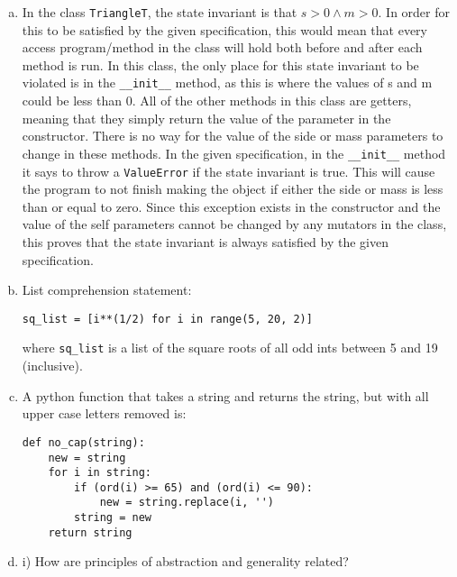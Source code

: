 \documentclass[12pt]{article}
\begin{document}
\begin{enumerate}[a)]
\item In the class \verb|TriangleT|, the state invariant is that $s > 0 \land m > 0$. In order 
for this to be satisfied by the given specification, this would mean that every access 
program/method in the class will hold both before and after each method is run. In this class, 
the only place for this state invariant to be violated is in the \verb|__init__| method, as this
is where the values of s and m could be less than 0. All of the other methods in this class are 
getters, meaning that they simply return the value of the parameter in the constructor. There is 
no way for the value of the side or mass parameters to change in these methods. In the given 
specification, in the \verb|__init__| method it says to throw a \verb|ValueError| if the state 
invariant is true. This will cause the program to not finish making the object if either the side 
or mass is less than or equal to zero. Since this exception exists in the constructor and the 
value of the self parameters cannot be changed by any mutators in the class, this proves that the 
state invariant is always satisfied by the given specification. 

\item List comprehension statement:

\begin{verbatim}
sq_list = [i**(1/2) for i in range(5, 20, 2)]
\end{verbatim}

where \verb|sq_list| is a list of the square roots of all odd ints between 5 and 19 (inclusive).

\item A python function that takes a string and returns the string, but with all upper case 
letters removed is:

\begin{verbatim}
def no_cap(string):
    new = string
    for i in string:
        if (ord(i) >= 65) and (ord(i) <= 90):
            new = string.replace(i, '')
        string = new
    return string
\end{verbatim}

\item i) How are principles of abstraction and generality related?


\end{enumerate}
\end{document}
